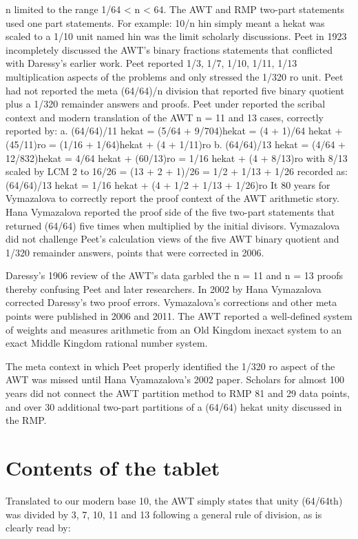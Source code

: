 \documentclass[12pt]{article}
\begin{document}
n limited to the range 1/64 < n < 64. The AWT and RMP two-part statements used one part statements. For example: 10/n hin simply meant a hekat was scaled to a 1/10 unit named hin was the limit scholarly discussions. Peet in 1923 incompletely discussed the AWT's binary fractions statements that conflicted with Daressy's earlier work. Peet reported 1/3, 1/7, 1/10, 1/11, 1/13 multiplication aspects of the problems and only stressed the 1/320 ro unit. Peet had not reported the meta (64/64)/n division that reported five binary quotient plus a 1/320 remainder answers and proofs. Peet under reported the scribal context and modern translation of the AWT n = 11 and 13 cases, correctly reported by: a. (64/64)/11 hekat = (5/64 + 9/704)hekat = (4 + 1)/64 hekat + (45/11)ro = (1/16 + 1/64)hekat + (4 + 1/11)ro b. (64/64)/13 hekat = (4/64 + 12/832)hekat = 4/64 hekat + (60/13)ro = 1/16 hekat + (4 + 8/13)ro with 8/13 scaled by LCM 2 to 16/26 = (13 + 2 + 1)/26 = 1/2 + 1/13 + 1/26 recorded as: (64/64)/13 hekat = 1/16 hekat + (4 + 1/2 + 1/13 + 1/26)ro It 80 years for Vymazalova to correctly report the proof context of the AWT arithmetic story. Hana Vymazalova reported the proof side of the five two-part statements that returned (64/64) five times when multiplied by the initial divisors. Vymazalova did not challenge Peet's calculation views of the five AWT binary quotient and 1/320 remainder answers, points that were corrected in 2006.

Daressy's 1906 review of the AWT's data garbled the n = 11 and n = 13 proofs thereby confusing Peet and later researchers. In 2002 by Hana Vymazalova corrected Daressy's two proof errors. Vymazalova's corrections and other meta points were published in 2006 and 2011.
The AWT reported a well-defined system of weights and measures arithmetic from an Old Kingdom inexact system to an exact Middle Kingdom rational number system.

The meta context in which Peet properly identified the 1/320 ro aspect of the AWT was missed until Hana Vyamazalova's 2002 paper. Scholars for almost 100 years did not connect the AWT partition method to RMP 81 and 29 data points, and over 30 additional two-part partitions of a (64/64) hekat unity discussed in the RMP.

\section{Contents of the tablet}

Translated to our modern base 10, the AWT simply states that unity (64/64th) was divided by 3, 7, 10, 11 and 13 following a general rule of division, as is clearly read by:
\end{document}

